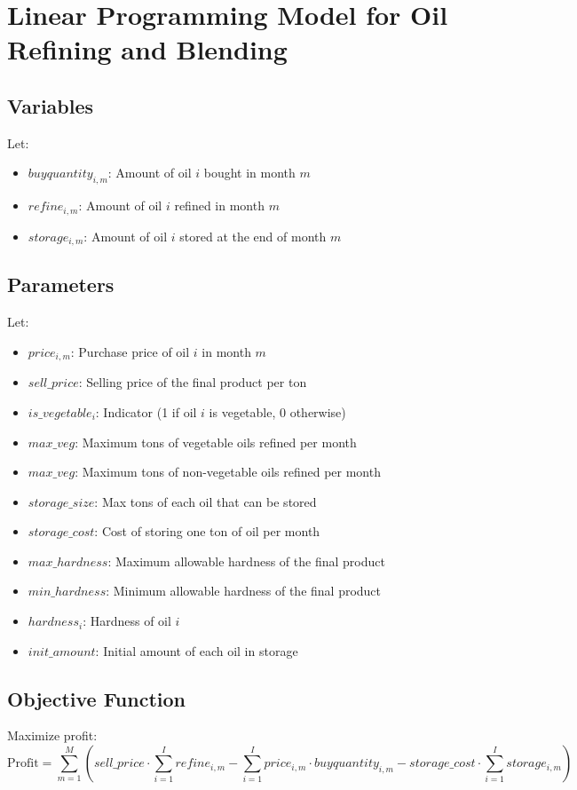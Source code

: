\documentclass{article}
\begin{document}
\section*{Linear Programming Model for Oil Refining and Blending}

\subsection*{Variables}
Let:
\begin{itemize}
    \item \(buyquantity_{i,m}\): Amount of oil \(i\) bought in month \(m\)
    \item \(refine_{i,m}\): Amount of oil \(i\) refined in month \(m\)
    \item \(storage_{i,m}\): Amount of oil \(i\) stored at the end of month \(m\)
\end{itemize}

\subsection*{Parameters}
Let:
\begin{itemize}
    \item \(price_{i,m}\): Purchase price of oil \(i\) in month \(m\)
    \item \(sell\_price\): Selling price of the final product per ton
    \item \(is\_vegetable_i\): Indicator (1 if oil \(i\) is vegetable, 0 otherwise)
    \item \(max\_veg\): Maximum tons of vegetable oils refined per month
    \item \(max\_veg\): Maximum tons of non-vegetable oils refined per month
    \item \(storage\_size\): Max tons of each oil that can be stored
    \item \(storage\_cost\): Cost of storing one ton of oil per month
    \item \(max\_hardness\): Maximum allowable hardness of the final product
    \item \(min\_hardness\): Minimum allowable hardness of the final product
    \item \(hardness_i\): Hardness of oil \(i\)
    \item \(init\_amount\): Initial amount of each oil in storage
\end{itemize}

\subsection*{Objective Function}
Maximize profit:
\[
\text{Profit} = \sum_{m=1}^{M} \left( sell\_price \cdot \sum_{i=1}^{I} refine_{i,m} - \sum_{i=1}^{I} price_{i,m} \cdot buyquantity_{i,m} - storage\_cost \cdot \sum_{i=1}^{I} storage_{i,m} \right)
\]
\end{document}
